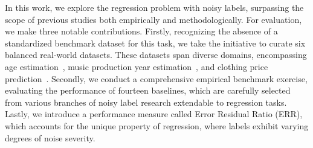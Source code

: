 \documentclass{article}
\def\ie{\textit{i.e}., } \def\Ie{\textit{I.e}., }
\theoremstyle{plain}
\theoremstyle{definition}
\theoremstyle{remark}
\begin{document}
In this work, we explore the regression problem with noisy labels, surpassing the scope of previous studies both empirically and methodologically.
For evaluation, we make three notable contributions.
Firstly, recognizing the absence of a standardized benchmark dataset for this task, we take the initiative to curate six balanced real-world datasets. 
These datasets span diverse domains, encompassing age estimation~\citep{niu16afad,lin2021imdbclean}, music production year estimation~\citep{bertin11msd}, and clothing price prediction~\citep{kimura21shift15m}.
Secondly, we conduct a comprehensive empirical benchmark exercise, evaluating the performance of fourteen baselines, which 
are carefully selected from various branches of noisy label research extendable to regression tasks.
Lastly, we introduce a performance measure called Error Residual Ratio (ERR), which accounts for the unique property of regression, where labels exhibit varying degrees of noise severity.
\end{document}
